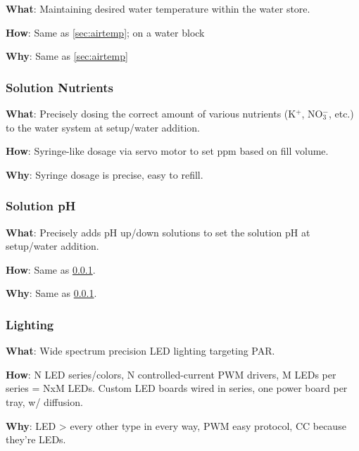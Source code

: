 \documentclass{report}
\begin{document}
\textbf{What}: Maintaining desired water temperature within the water store.

\textbf{How}: Same as \ref{sec:airtemp}; on a water block

\textbf{Why}: Same as \ref{sec:airtemp}

\subsubsection{Solution Nutrients}
\label{sec:nutrients}

\textbf{What}: Precisely dosing the correct amount of various nutrients (K${}^+$, NO${}_3^-$, etc.) to the water system at setup/water addition.


\textbf{How}: Syringe-like dosage via servo motor to set ppm based on fill volume.

\textbf{Why}: Syringe dosage is precise, easy to refill.

\subsubsection{Solution pH}
\label{sec:ph}

\textbf{What}: Precisely adds pH up/down solutions to set the solution pH at setup/water addition.

\textbf{How}: Same as \ref{sec:nutrients}.

\textbf{Why}: Same as \ref{sec:nutrients}.

\newpage

\subsubsection{Lighting}
\label{sec:lighting}

\textbf{What}: Wide spectrum precision LED lighting targeting PAR.

\textbf{How}: N LED series/colors, N controlled-current PWM drivers, M LEDs per series = NxM LEDs. Custom LED boards wired in series, one power board per tray, w/ diffusion.

\textbf{Why}: LED > every other type in every way, PWM easy protocol, CC because they’re LEDs.



% 
% 
\end{document}
